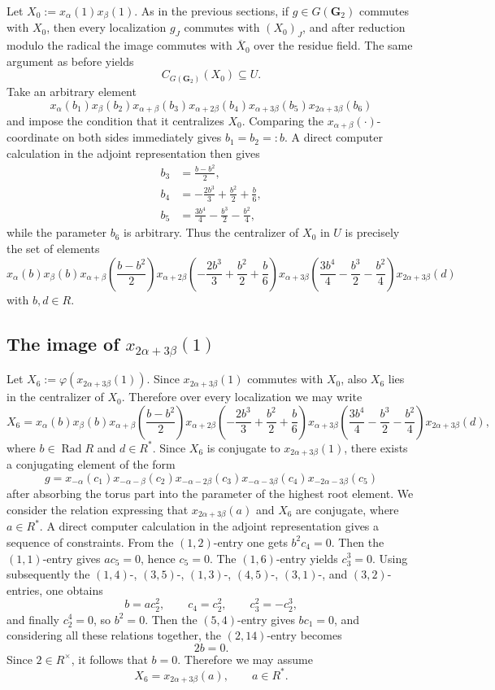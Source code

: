 \documentclass[]{jgcc}
\DeclareMathOperator{\Rad}{Rad}
\numberwithin{equation}{section}
\begin{document}
Let $X_0:=x_\alpha(1)x_\beta(1)$.
As in the previous sections, if $g\in G(\mathbf G_2)$ commutes with $X_0$, then every localization $g_J$ commutes with $(X_0)_J$,
and after reduction modulo the radical the image commutes with $\overline X_0$ over the residue field.
The same argument as before yields
\[
C_{G(\mathbf G_2)}(X_0)\subseteq U.
\]
Take an arbitrary element
\[
x_\alpha(b_1)x_\beta(b_2)x_{\alpha+\beta}(b_3)x_{\alpha+2\beta}(b_4)x_{\alpha+3\beta}(b_5)x_{2\alpha+3\beta}(b_6)
\]
and impose the condition that it centralizes $X_0$.
Comparing the $x_{\alpha+\beta}(\cdot)$-coordinate on both sides immediately gives $b_1=b_2=:b$.
A direct computer calculation in the adjoint representation then gives
\begin{align}
    b_3&=\frac{b-b^2}{2},\label{eq:G2-cent-b3}\\
    b_4&=-\frac{2b^3}{3}+\frac{b^2}{2}+\frac{b}{6},\label{eq:G2-cent-b4}\\
    b_5&=\frac{3b^4}{4}-\frac{b^3}{2}-\frac{b^2}{4},\label{eq:G2-cent-b5}
\end{align}
while the parameter $b_6$ is arbitrary.
Thus the centralizer of $X_0$ in $U$ is precisely the set of elements
\[
x_\alpha(b)x_\beta(b)x_{\alpha+\beta}\!\left(\frac{b-b^2}{2}\right)
x_{\alpha+2\beta}\!\left(-\frac{2b^3}{3}+\frac{b^2}{2}+\frac{b}{6}\right)
x_{\alpha+3\beta}\!\left(\frac{3b^4}{4}-\frac{b^3}{2}-\frac{b^2}{4}\right)x_{2\alpha+3\beta}(d)
\]
with $b,d\in R$.

\subsection{\texorpdfstring{The image of $x_{2\alpha+3\beta}(1)$}{The image of x2alpha+3beta(1)}}

Let $X_6:=\varphi(x_{2\alpha+3\beta}(1))$.
Since $x_{2\alpha+3\beta}(1)$ commutes with $X_0$, also $X_6$ lies in the centralizer of $X_0$.
Therefore over every localization we may write
\[
X_6=x_\alpha(b)x_\beta(b)x_{\alpha+\beta}\left( \frac{b-b^2}{2} \right)
x_{\alpha+2\beta}\left( -\frac{2b^3}{3}+\frac{b^2}{2}+\frac{b}{6} \right)
x_{\alpha+3\beta}\left( \frac{3b^4}{4} - \frac{b^3}{2} - \frac{b^2}{4}\right)x_{2\alpha+3\beta}(d),
\]
where $b\in \Rad R$ and $d\in R^*$.
Since $X_6$ is conjugate to $x_{2\alpha+3\beta}(1)$, there exists a conjugating element of the form
\[
g=x_{-\alpha}(c_1)x_{-\alpha-\beta}(c_2)x_{-\alpha-2\beta}(c_3)x_{-\alpha-3\beta}(c_4)x_{-2\alpha-3\beta}(c_5)
\]
after absorbing the torus part into the parameter of the highest root element.
We consider the relation expressing that $x_{2\alpha+3\beta}(a)$ and $X_6$ are conjugate, where $a\in R^*$.
A direct computer calculation in the adjoint representation gives a sequence of constraints.
From the $(1,2)$-entry one gets $b^2c_4=0$.
Then the $(1,1)$-entry gives $ac_5=0$, hence $c_5=0$.
The $(1,6)$-entry yields $c_3^3=0$.
Using subsequently the $(1,4)$-, $(3,5)$-, $(1,3)$-, $(4,5)$-, $(3,1)$-, and $(3,2)$-entries, one obtains
\[
b=ac_2^2,\qquad c_4=c_2^2,\qquad c_3^2=-c_2^3,
\]
and finally $c_2^4=0$, so $b^2=0$.
Then the $(5,4)$-entry gives $bc_1=0$, and considering all these relations together, the $(2,14)$-entry becomes
\[
2b=0.
\]
Since $2\in R^\times$, it follows that $b=0$.
Therefore we may assume
\[
X_6=x_{2\alpha+3\beta}(a),\qquad a\in R^*.
\]
\end{document}
